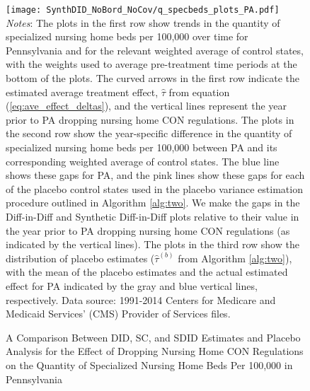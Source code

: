 \documentclass[../Main.tex]{subfiles}
\begin{document}
\newpage
{}
\begin{figure}[t] 
    \setlength{}
	\caption{\label{fig:q_specbeds_plots_pa} \centering A Comparison Between DID, SC, and SDID Estimates and Placebo Analysis for the Effect of Dropping Nursing Home CON Regulations on the Quantity of Specialized Nursing Home Beds Per 100,000 in Pennsylvania} {\centering\texttt{[image: SynthDID\_NoBord\_NoCov/q\_specbeds\_plots\_PA.pdf]}}
    \vspace{-1.4cm}\\
    \scriptsize
		\textit{Notes}: The plots in the first row show trends in the quantity of specialized nursing home beds per 100,000 over time for Pennsylvania and for the relevant weighted average of control states, with the weights used to average pre-treatment time periods at the bottom of the plots. The curved arrows in the first row indicate the estimated average treatment effect, $\hat{\tau}$ from equation (\ref{eq:ave_effect_deltas}), and the vertical lines represent the year prior to PA dropping nursing home CON regulations. The plots in the second row show the year-specific difference in the quantity of specialized nursing home beds per 100,000 between PA and its corresponding weighted average of control states. The blue line shows these gaps for PA, and the pink lines show these gaps for each of the placebo control states used in the placebo variance estimation procedure outlined in Algorithm \ref{alg:two}. We make the gaps in the Diff-in-Diff and Synthetic Diff-in-Diff plots relative to their value in the year prior to PA dropping nursing home CON regulations (as indicated by the vertical lines). The plots in the third row show the distribution of placebo estimates ($\hat{\tau}^{(b)}$ from Algorithm \ref{alg:two}), with the mean of the placebo estimates and the actual estimated effect for PA indicated by the gray and blue vertical lines, respectively. Data source: 1991-2014 Centers for Medicare and Medicaid Services’ (CMS) Provider of Services files.
\end{figure}
\restoregeometry
\clearpage
\end{document}
